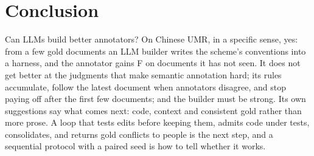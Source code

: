 \section{Conclusion}

Can LLMs build better annotators? On Chinese UMR, in a specific sense, yes: from a few gold documents an LLM builder writes the scheme's conventions into a harness, and the annotator gains \gainF{} F on documents it has not seen. It does not get better at the judgments that make semantic annotation hard; its rules accumulate, follow the latest document when annotators disagree, and stop paying off after the first few documents; and the builder must be strong. Its own suggestions say what comes next: code, context and consistent gold rather than more prose. A loop that tests edits before keeping them, admits code under tests, consolidates, and returns gold conflicts to people is the next step, and a sequential protocol with a paired seed is how to tell whether it works.

